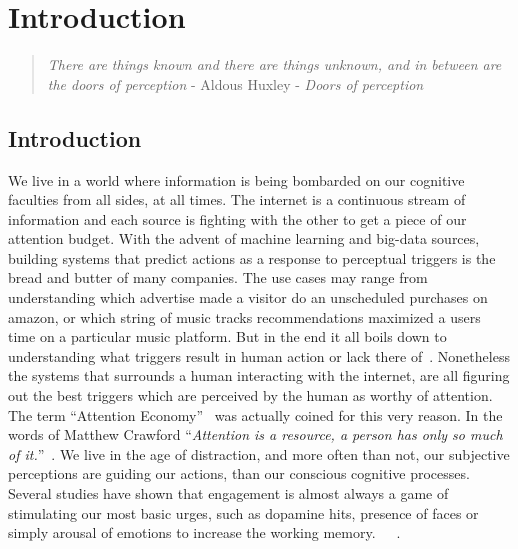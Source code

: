 
\chapter{Introduction}  %

\graphicspath{{Chapter1/Figures/} {Chapter1/Figures}}
\begin{quote}
\textsl{There are things known and there are things unknown, and in between are the doors of perception} - Aldous Huxley - \textsl{Doors of perception}
\end{quote}


\section{Introduction}

We live in a world where information is being bombarded on our cognitive faculties from all sides, at all times. The internet is a continuous stream of information and each source is fighting with the other to get a piece of our attention budget. 
With the advent of machine learning and big-data sources, building systems that predict actions as a response to perceptual triggers is the bread and butter of many companies. The use cases may range from understanding which advertise made a visitor do an unscheduled purchases on amazon, or which string of music tracks recommendations maximized a users time on a particular music platform. But in the end it all boils down to understanding what triggers result in human action or lack there of~\cite{song2012survey}. Nonetheless the systems that surrounds a human interacting with the internet, are all figuring out the best triggers which are perceived by the human as worthy of attention. 
The term ``Attention Economy''~\cite{davenport2001attention} was actually coined for this very reason. In the words of Matthew Crawford ``\textit{Attention is a resource, a person has only so much of it.}''~\cite{MatthewCrawford}. We live in the age of distraction, and more often than not, our subjective perceptions are guiding our actions, than our conscious cognitive processes. Several studies have shown that engagement is almost always a game of stimulating our most basic urges, such as dopamine hits, presence of faces or simply arousal of emotions to increase the working memory.~\cite{bakhshi2014faces,joglekar2017like}~\cite{schupp2006emotion}~\cite{soat2015social}. 


